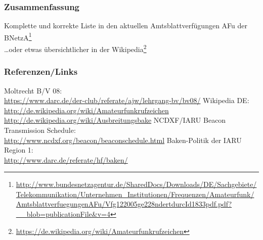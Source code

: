 \begin{frame}
  \frametitle{Zusammenfassung}

  Komplette und korrekte Liste in den aktuellen Amtsblattverfügungen AFu der
  BNetzA\footnote{\ExternalLink\url{http://www.bundesnetzagentur.de/SharedDocs/Downloads/DE/Sachgebiete/Telekommunikation/Unternehmen_Institutionen/Frequenzen/Amateurfunk/AmtsblattverfuegungenAFu/Vfg122005ge228ndertdurcId1833pdf.pdf?__blob=publicationFile&v=4}}\\[2em]

  \dots oder etwas übersichtlicher in der Wikipedia\footnote{\ExternalLink\url{https://de.wikipedia.org/wiki/Amateurfunkrufzeichen}}


\end{frame}

\renewcommand{\refname}{Referenzen}

\begin{frame}
  \frametitle{Referenzen/Links}
  \hypertarget{refs}{}
  \footnotesize

  \begin{thebibliography}{}
     Moltrecht B/V 08: \\
      \url{https://www.darc.de/der-club/referate/ajw/lehrgang-bv/bv08/}
        Wikipedia DE: \\
      \url{http://de.wikipedia.org/wiki/Amateurfunkrufzeichen} \\
      \url{http://de.wikipedia.org/wiki/Ausbreitungsbake}
       NCDXF/IARU Beacon Transmission Schedule: \\
      \url{http://www.ncdxf.org/beacon/beaconschedule.html}
      Baken-Politik der IARU Region 1: \\
      \url{http://www.darc.de/referate/hf/baken/}
  \end{thebibliography}

\end{frame}


